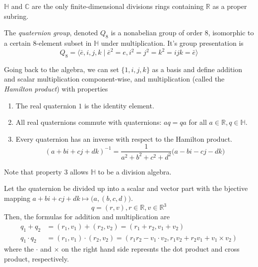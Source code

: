 \documentclass{article}
\begin{document}
    \begin{proposition}
      $\mathbb{H}$ and $\mathbb{C}$ are the only finite-dimensional divisions rings containing $\mathbb{R}$ as a proper subring. 
    \end{proposition}

    \begin{definition}
      The \textit{quaternion group}, denoted $Q_8$ is a nonabelian group of order $8$, isomorphic to a certain $8$-element subset in $\mathbb{H}$ under multiplication. It's group presentation is 
      \[Q_8 = \big\langle \bar{e}, i, j, k \;|\; \bar{e}^2 = e, i^2 = j^2 = k^2 = ijk = \bar{e} \big\rangle\]
    \end{definition}

    Going back to the algebra, we can set $\{1, i, j, k\}$ as a basis and define addition and scalar multiplication component-wise, and multiplication (called the \textit{Hamilton product}) with properties
    \begin{enumerate}
      \item The real quaternion $1$ is the identity element. 
      \item All real quaternions commute with quaternions: $a q = q a$ for all $a \in \mathbb{R}, q \in \mathbb{H}$. 
      \item Every quaternion has an inverse with respect to the Hamilton product. 
      \[(a + bi + cj + dk)^{-1} = \frac{1}{a^2 + b^2 + c^2 + d^2} \big( a - bi - cj - dk\big)\]
    \end{enumerate}
    Note that property 3 allows $\mathbb{H}$ to be a division algebra. 

    \begin{proposition}
      Let the quaternion be divided up into a scalar and vector part with the bjective mapping $a + bi + cj + dk \mapsto \big(a, (b, c, d)\big)$. 
      \[q = (r, v), r \in \mathbb{R}, v \in \mathbb{R}^3\]
      Then, the formulas for addition and multiplication are
      \begin{align*}
        q_1 + q_2 & = (r_1, v_1) + (r_2, v_2) = (r_1 + r_2, v_1 + v_2) \\
        q_1 \cdot q_2 & = (r_1, v_1) \cdot (r_2, v_2) = (r_1 r_2 - v_1 \cdot v_2, r_1 v_2 + r_2 v_1 + v_1 \times v_2)
      \end{align*}
      where the $\cdot$ and $\times$ on the right hand side represnts the dot product and cross product, respectively. 
    \end{proposition}
\end{document}
